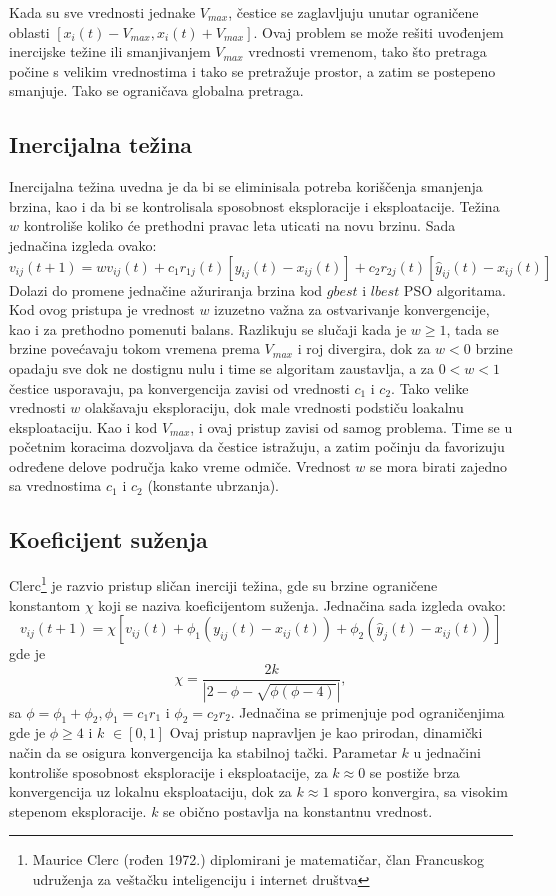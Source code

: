 \documentclass[a4paper]{article}
\begin{document}
Kada su sve vrednosti jednake $V_{max}$, čestice se zaglavljuju unutar ograničene oblasti $[x_i(t)-V_{max} , x_i(t) + V_{max} ]$.  Ovaj problem se može rešiti uvođenjem inercijske težine ili smanjivanjem  $V_{max}$ vrednosti vremenom, tako što pretraga počine s velikim vrednostima i tako se pretražuje prostor, a zatim se postepeno smanjuje. Tako se ograničava globalna pretraga.

\subsection{Inercijalna težina}
Inercijalna težina uvedna je da bi se eliminisala potreba koriščenja smanjenja brzina, kao i da bi se kontrolisala sposobnost eksploracije i eksploatacije. Težina $w$ kontroliše koliko će prethodni pravac leta uticati na novu brzinu. Sada jednačina izgleda ovako:
\[v_{ij}(t+1) = wv_{ij}(t) + c_1r_{1j}(t)[y_{ij}(t) - x_{ij}(t)] + c_2r_{2j}(t)[\hat{y}_{ij}(t) - x_{ij}(t)] \]
Dolazi do promene jednačine ažuriranja brzina kod $gbest$ i $lbest$ PSO algoritama.
Kod ovog pristupa je vrednost $w$ izuzetno važna za ostvarivanje konvergencije, kao i za prethodno pomenuti balans. Razlikuju se slučaji kada je $w \geq 1$, tada se brzine povećavaju tokom vremena prema $V_{max}$ i roj divergira, dok za $w < 0$ brzine opadaju sve dok ne dostignu nulu i time se algoritam zaustavlja, a za $0 < w < 1$ čestice usporavaju, pa konvergencija zavisi od vrednosti $c_1$ i $c_2$. Tako velike vrednosti  $w$ olakšavaju eksploraciju, dok male vrednosti podstiču loakalnu eksploataciju. 
Kao i kod $V_{max}$, i ovaj pristup zavisi od samog problema. Time se u početnim koracima dozvoljava da čestice istražuju, a zatim počinju da favorizuju određene delove područja kako vreme odmiče.
Vrednost $w$ se mora birati zajedno sa vrednostima $c_1$ i $c_2$ (konstante ubrzanja).

\subsection{Koeficijent suženja}
Clerc\footnote{Maurice Clerc (rođen 1972.) diplomirani je matematičar, član Francuskog udruženja za veštačku inteligenciju i internet društva} je razvio pristup sličan inerciji težina, gde su brzine ograničene konstantom $\chi$ koji se naziva koeficijentom suženja. Jednačina sada izgleda ovako:
\[v_{ij} (t + 1) = \chi[v_{ij} (t) + \phi_1 (y_{ij} (t) - x_{ij} (t)) + \phi_2 (\hat{y}_j (t) - x_{ij} (t))]\]
gde je $$\chi = \frac{2k}{|2-\phi-\sqrt{\phi(\phi-4)}|},$$sa $\phi = \phi_1 +  \phi_2 , \phi_1 = c_1r_1$ i $\phi_2 = c_2r_2$.
Jednačina se primenjuje pod ograničenjima gde je $\phi \geq 4$ i $k$ $\in [0, 1]$
Ovaj pristup napravljen je kao prirodan, dinamički način da se osigura konvergencija ka stabilnoj tački.
Parametar $k$ u jednačini kontroliše sposobnost eksploracije i eksploatacije, za $k \approx 0$ se postiže brza konvergencija uz lokalnu eksploataciju, dok za  $k \approx 1$ sporo konvergira, sa visokim stepenom eksploracije. $k$ se obično postavlja na konstantnu vrednost.
\end{document}
